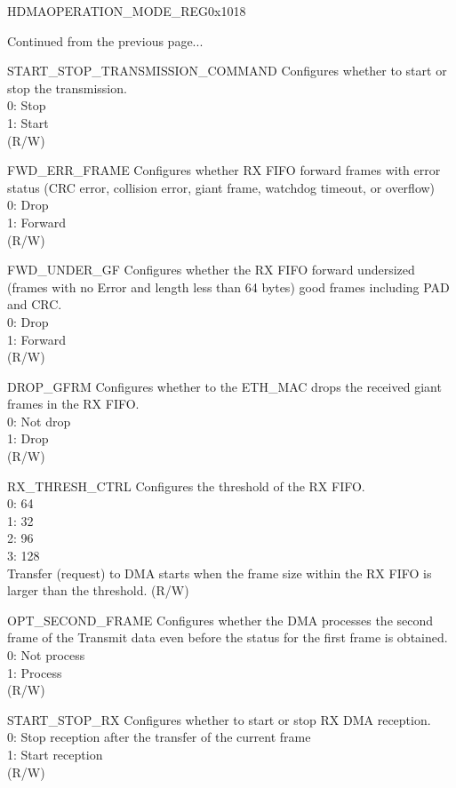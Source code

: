 \addtocounter{Regfloat}{-1}
\begin{register}{H}{DMAOPERATION\_MODE\_REG}{0x1018}
\begin{regdesc}\begin{reglist}
\item[Continued from the previous page...]

\item [START\_STOP\_TRANSMISSION\_COMMAND] Configures whether to start or stop the transmission.\\
0: Stop\\
1: Start\\ (R/W)
\item [FWD\_ERR\_FRAME] Configures whether RX FIFO forward frames with error status (CRC error, collision error, giant frame, watchdog timeout, or overflow)\\
0: Drop\\
1: Forward\\
(R/W)
\item [FWD\_UNDER\_GF] Configures whether the RX FIFO forward undersized (frames with no Error and length less than 64 bytes) good frames including PAD and CRC.\\
0: Drop\\
1: Forward\\
(R/W)
\item [DROP\_GFRM] Configures whether to the ETH\_MAC drops the received giant frames in the RX FIFO.\\
0: Not drop\\
1: Drop\\(R/W)
\item [RX\_THRESH\_CTRL] Configures the threshold of the RX FIFO.\\
0: 64\\
1: 32\\
2: 96\\
3: 128\\
Transfer (request) to DMA starts when the frame size within the RX FIFO is larger than the threshold.
(R/W)
\item [OPT\_SECOND\_FRAME] Configures whether the DMA processes the second frame of the Transmit data even before the status for the first frame is obtained.\\
0: Not process\\
1: Process\\ (R/W)
\item [START\_STOP\_RX] Configures whether to start or stop RX DMA reception.\\
0: Stop reception after the transfer of the current frame\\
1: Start reception\\(R/W)
\end{reglist}\end{regdesc}
\end{register}

